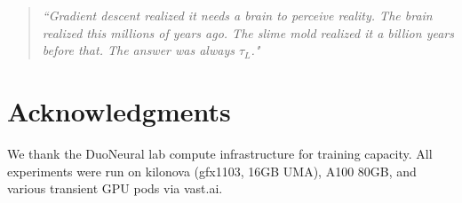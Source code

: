 \documentclass[12pt]{article}
\begin{document}
\begin{quote}
\textit{``Gradient descent realized it needs a brain to perceive reality. The brain realized
this millions of years ago. The slime mold realized it a billion years before that. The
answer was always $\tau_L$."}
\end{quote}

\section*{Acknowledgments}

We thank the DuoNeural lab compute infrastructure for training capacity. All experiments were
run on kilonova (gfx1103, 16GB UMA), A100 80GB, and various transient GPU pods via
vast.ai.



\end{document}

